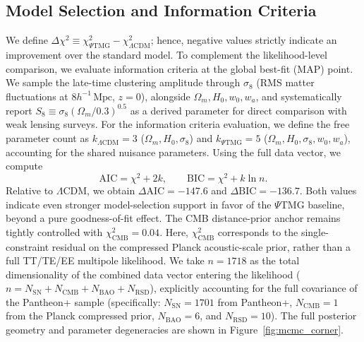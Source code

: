 \documentclass[11pt, a4paper]{article}
\begin{document}
\subsection*{Model Selection and Information Criteria}
We define $\Delta\chi^2 \equiv \chi^2_{\Psi\mathrm{TMG}} - \chi^2_{\Lambda\mathrm{CDM}}$; hence, negative values strictly indicate an improvement over the standard model. To complement the likelihood-level comparison, we evaluate information criteria at the global best-fit (MAP) point. We sample the late-time clustering amplitude through $\sigma_8$ (RMS matter fluctuations at $8 h^{-1}\,\text{Mpc}$, $z=0$), alongside $\Omega_m, H_0, w_0, w_a$, and systematically report $S_8 \equiv \sigma_8 (\Omega_m / 0.3)^{0.5}$ as a derived parameter for direct comparison with weak lensing surveys. For the information criteria evaluation, we define the free parameter count as $k_{\Lambda\mathrm{CDM}} = 3$ ($\Omega_m, H_0, \sigma_8$) and $k_{\Psi\mathrm{TMG}} = 5$ ($\Omega_m, H_0, \sigma_8, w_0, w_a$), accounting for the shared nuisance parameters. Using the full data vector, we compute
\[
\mathrm{AIC} = \chi^2 + 2k, \qquad \mathrm{BIC} = \chi^2 + k \ln n .
\]
Relative to $\Lambda$CDM, we obtain $\Delta \mathrm{AIC} = -147.6$ and $\Delta \mathrm{BIC} = -136.7$. Both values indicate even stronger model-selection support in favor of the $\Psi$TMG baseline, beyond a pure goodness-of-fit effect. The CMB distance-prior anchor remains tightly controlled with $\chi^2_{\mathrm{CMB}} = 0.04$.
Here, $\chi^2_{\mathrm{CMB}}$ corresponds to the single-constraint residual on the compressed Planck acoustic-scale prior, rather than a full TT/TE/EE multipole likelihood.
We take $n = 1718$ as the total dimensionality of the combined data vector entering the likelihood ($n = N_{\mathrm{SN}} + N_{\mathrm{CMB}} + N_{\mathrm{BAO}} + N_{\mathrm{RSD}}$), explicitly accounting for the full covariance of the Pantheon+ sample (specifically: $N_{\mathrm{SN}} = 1701$ from Pantheon+, $N_{\mathrm{CMB}} = 1$ from the Planck compressed prior, $N_{\mathrm{BAO}} = 6$, and $N_{\mathrm{RSD}} = 10$).
The full posterior geometry and parameter degeneracies are shown in Figure~\ref{fig:mcmc_corner}.
\end{document}
